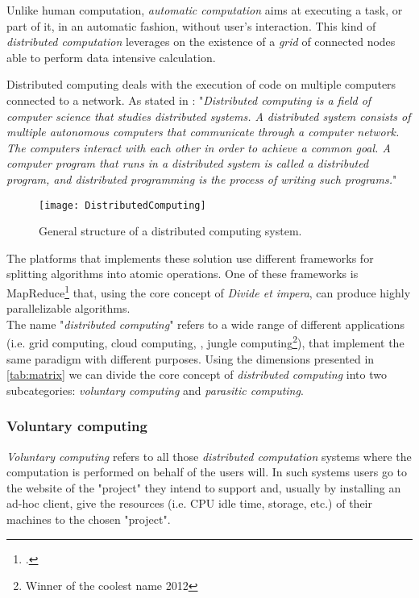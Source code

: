
Unlike human computation, \emph{automatic computation} aims at executing a task, or
part of it, in an automatic fashion, without user's interaction. This kind of
\emph{distributed computation} leverages on the existence of a \emph{grid} of
connected nodes able to perform data intensive calculation.


Distributed computing deals with the execution of code on multiple computers
connected to a network. As stated in \cite{andrewsfoundations}: "\emph{Distributed
computing is a field of computer science that studies distributed systems. A
distributed system consists of multiple autonomous computers that communicate
through a computer network. The computers interact with each other in order to
achieve a common goal. A computer program that runs in a distributed system is
called a distributed program, and distributed programming is the process of
writing such programs.}"
\begin{figure}[htb]
    \centering
    \texttt{[image: DistributedComputing]}
    \caption{General structure of a distributed computing system.}
    \label{fig:distributed-computing}
\end{figure}

The platforms that implements these solution use different frameworks for splitting
algorithms into atomic operations. One of these frameworks
is MapReduce\footcite{dean2008mapreduce} that, using the core concept of
\emph{Divide et impera}, can produce highly parallelizable algorithms.\\

The name "\emph{distributed computing}" refers to a wide range of different
applications (i.e. grid computing, cloud computing,
, jungle computing\footnote{Winner of the
coolest name 2012}), that implement the same paradigm with different purposes.
Using the dimensions presented in \autoref{tab:matrix} we can divide the
core concept of \emph{distributed computing} into two subcategories: \emph{voluntary
computing} and \emph{parasitic computing}.


\subsubsection{Voluntary computing}
\label{sec:bg:crowd:auto:voluntary}
\emph{Voluntary computing} refers to all those \emph{distributed computation}
systems where the computation is performed on behalf of the users will. In such
systems users go to the website of the "project" they intend to support and, usually
by installing an ad-hoc client, give the resources (i.e. CPU idle time, storage,
etc.) of their machines to the chosen "project".\\


